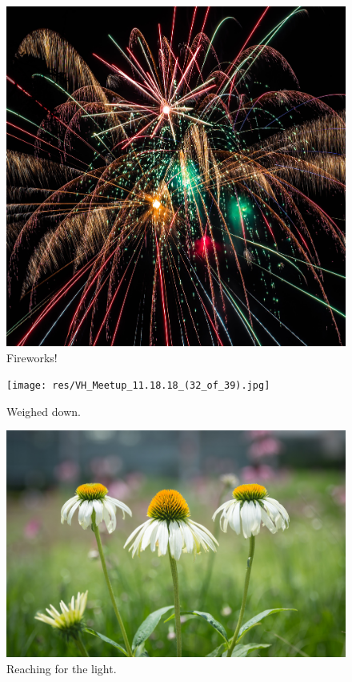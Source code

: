 \documentclass{report}
\begin{document}
\begin{figure}
  \includegraphics[width=\linewidth]{res/fireworks.jpg}
  \caption{Fireworks!}
\end{figure}

\begin{figure}
  \texttt{[image: res/VH\_Meetup\_11.18.18\_(32\_of\_39).jpg]}
  \caption{Weighed down.}
\end{figure}

\begin{figure}
  \includegraphics[width=\linewidth]{res/symmetricalflowers.jpg}
  \caption{Reaching for the light.}
\end{figure}
\end{document}

